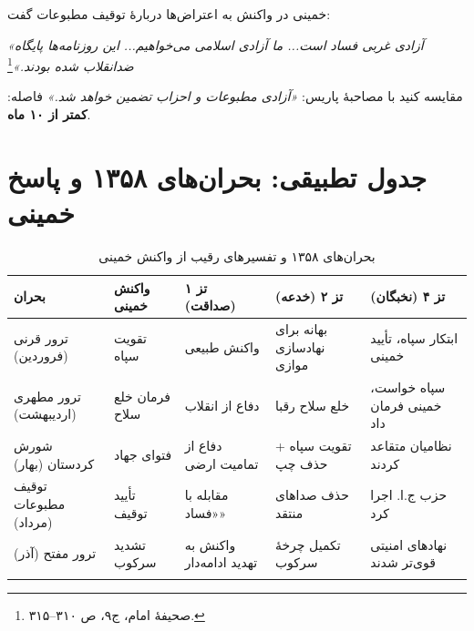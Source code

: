\documentclass[12pt,a4paper]{book}
\newcommand{\keyword}[1]{\textbf{\textcolor{cPrimary}{#1}}}
\begin{document}
\begin{warningBox}
خمینی در واکنش به اعتراض‌ها دربارهٔ توقیف مطبوعات گفت:

\textit{«آزادی غربی فساد است... ما آزادی اسلامی می‌خواهیم... این روزنامه‌ها پایگاه ضدانقلاب شده بودند.»}\footnote{صحیفهٔ امام، ج۹، ص ۳۱۰–۳۱۵.}

مقایسه کنید با مصاحبهٔ پاریس: \textit{«آزادی مطبوعات و احزاب تضمین خواهد شد.»} فاصله: \keyword{کمتر از ۱۰ ماه}.
\end{warningBox}

\section{جدول تطبیقی: بحران‌های ۱۳۵۸ و پاسخ خمینی}

\begin{longtable}{%
    >{\raggedleft\arraybackslash}p{}
    >{\raggedleft\arraybackslash}p{}
    >{\raggedleft\arraybackslash}p{}
    >{\raggedleft\arraybackslash}p{}
    >{\raggedleft\arraybackslash}p{}}
\toprule
\rowcolor{cPrimary!10}
\textbf{بحران} & \textbf{واکنش خمینی} & \textbf{تز ۱ (صداقت)} & \textbf{تز ۲ (خدعه)} & \textbf{تز ۴ (نخبگان)} \\
\midrule
\endhead

ترور قرنی (فروردین) &
تقویت سپاه &
واکنش طبیعی &
بهانه برای نهادسازی موازی &
ابتکار سپاه، تأیید خمینی \\
\midrule

ترور مطهری (اردیبهشت) &
فرمان خلع سلاح &
دفاع از انقلاب &
خلع سلاح رقبا &
سپاه خواست، خمینی فرمان داد \\
\midrule

شورش کردستان (بهار) &
فتوای جهاد &
دفاع از تمامیت ارضی &
تقویت سپاه + حذف چپ &
نظامیان متقاعد کردند \\
\midrule

توقیف مطبوعات (مرداد) &
تأیید توقیف &
مقابله با «فساد» &
حذف صداهای منتقد &
حزب ج.ا. اجرا کرد \\
\midrule

ترور مفتح (آذر) &
تشدید سرکوب &
واکنش به تهدید ادامه‌دار &
تکمیل چرخهٔ سرکوب &
نهادهای امنیتی قوی‌تر شدند \\

\bottomrule
\caption{بحران‌های ۱۳۵۸ و تفسیرهای رقیب از واکنش خمینی}
\label{tab:crises-1358}
\end{longtable}
\end{document}
